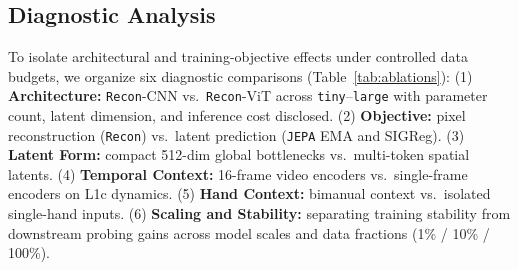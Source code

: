 \begin{table}[t]
\centering
\small
{}
\caption{L2 Generalization and Robustness protocol. For cross-quantity transfers (intensity proxy $\leftrightarrow$ depth proxy), zero-shot evaluation uses rank/classification metrics rather than uncalibrated gray-level errors.}
\label{tab:l2_generalization}
\end{table}

\subsection{Diagnostic Analysis}
\label{sec:exp_ablations}
To isolate architectural and training-objective effects under controlled data budgets, we organize six diagnostic comparisons (Table~\ref{tab:ablations}):
(1) \textbf{Architecture:} \texttt{Recon}-CNN vs.\ \texttt{Recon}-ViT across \texttt{tiny}--\texttt{large} with parameter count, latent dimension, and inference cost disclosed.
(2) \textbf{Objective:} pixel reconstruction (\texttt{Recon}) vs.\ latent prediction (\texttt{JEPA} EMA and SIGReg).
(3) \textbf{Latent Form:} compact 512-dim global bottlenecks vs.\ multi-token spatial latents.
(4) \textbf{Temporal Context:} 16-frame video encoders vs.\ single-frame encoders on L1c dynamics.
(5) \textbf{Hand Context:} bimanual context vs.\ isolated single-hand inputs.
(6) \textbf{Scaling and Stability:} separating training stability from downstream probing gains across model scales and data fractions (1\% / 10\% / 100\%).


